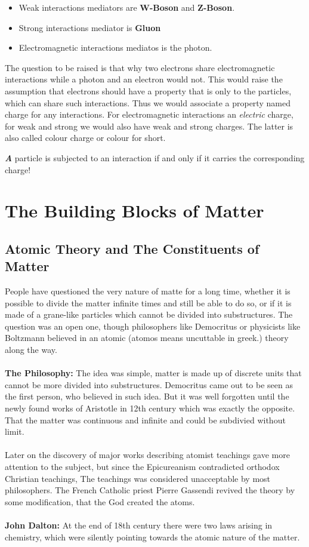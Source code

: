 \documentclass[10pt,a4paper]{article}
\newcounter{theo}
\newenvironment{callout}
	{\begin{calloutbox}\color{charcoal}\textbf\textit}
	{\end{calloutbox}}
\begin{document}
\begin{itemize}
     \item Weak interactions mediators are \textbf{W-Boson} and \textbf{Z-Boson}.
     \item Strong interactions mediator is \textbf{Gluon}
     \item Electromagnetic interactions mediatos is the photon.
\end{itemize}

The question to be raised is that why two electrons share electromagnetic interactions while a photon and an electron would not. This would raise the assumption that electrons should have a property that is only to the particles, which can share such interactions. Thus we would associate a property named charge for any interactions. For electromagnetic interactions an \textit{electric} charge, for weak and strong we would also have weak and strong charges. The latter is also called colour charge or colour for short.

\begin{callout}
     A particle is subjected to an interaction if and only if it carries the corresponding charge!
\end{callout}

\section{The Building Blocks of Matter}
\subsection{Atomic Theory and The Constituents of Matter}
People have questioned the very nature of matte for a long time, whether it is possible to divide the matter infinite times and still be able to do so, or if it is made of a grane-like particles which cannot be divided into substructures. The question was an open one, though philosophers like Democritus or physicists like Boltzmann believed in an atomic (atomos means uncuttable in greek.) theory along the way. 
\\
\\
\textbf{The Philosophy:} The idea was simple, matter is made up of discrete units that cannot be more divided into substructures. Democritus came out to be seen as the first person, who believed in such idea. But it was well forgotten until the newly found works of Aristotle in 12th century which was exactly the opposite. That the matter was continuous and infinite and could be subdivied without limit.
\\
\\
Later on the discovery of major works describing atomist teachings gave more attention to the subject, but since the Epicureanism contradicted orthodox Christian teachings, The teachings was considered unacceptable by most philosophers. The French Catholic priest Pierre Gassendi revived the theory by some modification, that the God created the atoms.
\\
\\
\textbf{John Dalton:} At the end of 18th century there were two laws arising in chemistry, which were silently pointing towards the atomic nature of the matter. 
\end{document}

